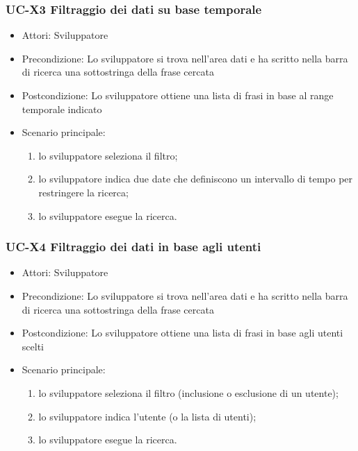 	\subsubsection{UC-X3 Filtraggio dei dati su base temporale}	
		\begin{itemize}
			\item Attori: Sviluppatore
			\item Precondizione: Lo sviluppatore si trova nell'area dati e ha scritto nella barra di ricerca una sottostringa della frase cercata
			\item Postcondizione: Lo sviluppatore ottiene una lista di frasi in base al range temporale indicato
			\item Scenario principale:
				\begin{enumerate}
					\item lo sviluppatore seleziona il filtro;
					\item lo sviluppatore indica due date che definiscono un intervallo di tempo per restringere la ricerca;
					\item lo sviluppatore esegue la ricerca.
				\end{enumerate}
		\end{itemize}	
	
	\subsubsection{UC-X4 Filtraggio dei dati in base agli utenti}	
		\begin{itemize}
			\item Attori: Sviluppatore
			\item Precondizione: Lo sviluppatore si trova nell'area dati e ha scritto nella barra di ricerca una sottostringa della frase cercata
			\item Postcondizione: Lo sviluppatore ottiene una lista di frasi in base agli utenti scelti
			\item Scenario principale:
				\begin{enumerate}
					\item lo sviluppatore seleziona il filtro (inclusione o esclusione di un utente);
					\item lo sviluppatore indica l'utente (o la lista di utenti);
					\item lo sviluppatore esegue la ricerca.
				\end{enumerate}
		\end{itemize}	
	
